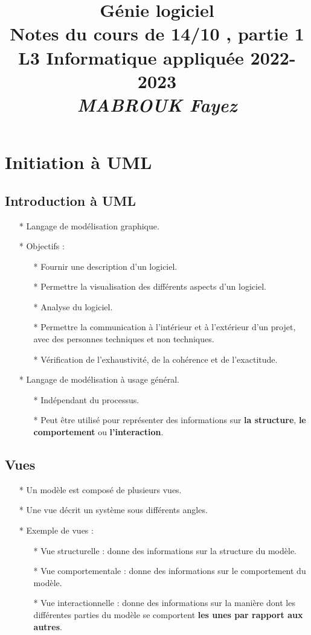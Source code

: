 \documentclass[12pt]{article}
\title{{\bf  Génie logiciel} \\
	Notes du cours de 14/10 , partie 1 \\
	{\small L3 Informatique appliquée 2022-2023} \\
	{\it \small MABROUK Fayez}}
\begin{document}
	\maketitle
	\newpage
	\section{Initiation à UML}
	\subsection{Introduction à UML}
	\begin{itemize}
		\item [*] Langage de modélisation graphique.
		\item [*] Objectifs :
		\begin{itemize}
			\item [*] Fournir une description d'un logiciel.
			\item [*] Permettre la visualisation des différents aspects d'un logiciel.
			\item [*] Analyse du logiciel.
			\item [*] Permettre la communication à l'intérieur et à l'extérieur d'un projet, avec des personnes techniques et non techniques.
			\item [*] Vérification de l'exhaustivité, de la cohérence et de l'exactitude.
				\end{itemize}
	\item [*] Langage de modélisation à usage général.
		\begin{itemize}
			\item [*] Indépendant du processus.
			\item [*] Peut être utilisé pour représenter des informations sur \textbf{la structure}, \textbf{le comportement} ou \textbf{l'interaction}.
	
		\end{itemize}
	\end{itemize}
\subsection{Vues}
\begin{itemize}
	\item [*] Un modèle est composé de plusieurs vues.
	\item [*] Une vue décrit un système sous différents angles.
	\item [*] Exemple de vues :
	\begin{itemize}
		\item [*]  Vue structurelle : donne des informations sur la structure du modèle.
		\item [*] Vue comportementale : donne des informations sur le comportement du modèle.
		\item [*] Vue interactionnelle : donne des informations sur la manière dont les différentes parties du modèle se comportent \textbf{les unes par rapport aux autres}.
		
	\end{itemize}
\end{itemize}
\end{document}
